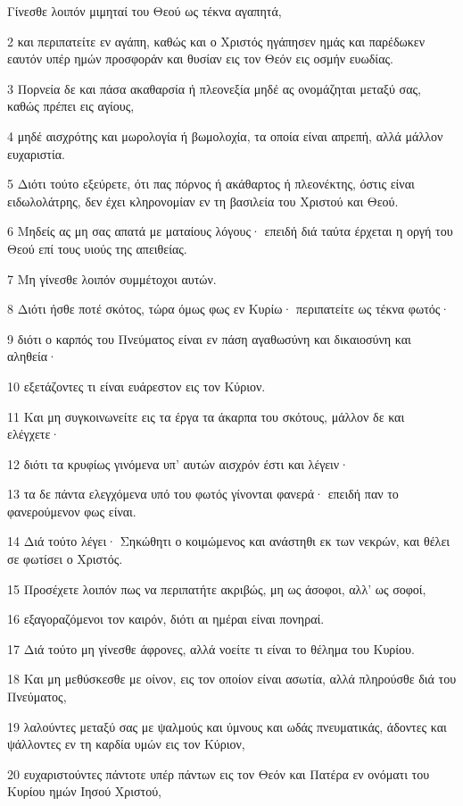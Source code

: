 \par Γίνεσθε λοιπόν μιμηταί του Θεού ως τέκνα αγαπητά,
\par 2 και περιπατείτε εν αγάπη, καθώς και ο Χριστός ηγάπησεν ημάς και παρέδωκεν εαυτόν υπέρ ημών προσφοράν και θυσίαν εις τον Θεόν εις οσμήν ευωδίας.
\par 3 Πορνεία δε και πάσα ακαθαρσία ή πλεονεξία μηδέ ας ονομάζηται μεταξύ σας, καθώς πρέπει εις αγίους,
\par 4 μηδέ αισχρότης και μωρολογία ή βωμολοχία, τα οποία είναι απρεπή, αλλά μάλλον ευχαριστία.
\par 5 Διότι τούτο εξεύρετε, ότι πας πόρνος ή ακάθαρτος ή πλεονέκτης, όστις είναι ειδωλολάτρης, δεν έχει κληρονομίαν εν τη βασιλεία του Χριστού και Θεού.
\par 6 Μηδείς ας μη σας απατά με ματαίους λόγους· επειδή διά ταύτα έρχεται η οργή του Θεού επί τους υιούς της απειθείας.
\par 7 Μη γίνεσθε λοιπόν συμμέτοχοι αυτών.
\par 8 Διότι ήσθε ποτέ σκότος, τώρα όμως φως εν Κυρίω· περιπατείτε ως τέκνα φωτός·
\par 9 διότι ο καρπός του Πνεύματος είναι εν πάση αγαθωσύνη και δικαιοσύνη και αληθεία·
\par 10 εξετάζοντες τι είναι ευάρεστον εις τον Κύριον.
\par 11 Και μη συγκοινωνείτε εις τα έργα τα άκαρπα του σκότους, μάλλον δε και ελέγχετε·
\par 12 διότι τα κρυφίως γινόμενα υπ' αυτών αισχρόν έστι και λέγειν·
\par 13 τα δε πάντα ελεγχόμενα υπό του φωτός γίνονται φανερά· επειδή παν το φανερούμενον φως είναι.
\par 14 Διά τούτο λέγει· Σηκώθητι ο κοιμώμενος και ανάστηθι εκ των νεκρών, και θέλει σε φωτίσει ο Χριστός.
\par 15 Προσέχετε λοιπόν πως να περιπατήτε ακριβώς, μη ως άσοφοι, αλλ' ως σοφοί,
\par 16 εξαγοραζόμενοι τον καιρόν, διότι αι ημέραι είναι πονηραί.
\par 17 Διά τούτο μη γίνεσθε άφρονες, αλλά νοείτε τι είναι το θέλημα του Κυρίου.
\par 18 Και μη μεθύσκεσθε με οίνον, εις τον οποίον είναι ασωτία, αλλά πληρούσθε διά του Πνεύματος,
\par 19 λαλούντες μεταξύ σας με ψαλμούς και ύμνους και ωδάς πνευματικάς, άδοντες και ψάλλοντες εν τη καρδία υμών εις τον Κύριον,
\par 20 ευχαριστούντες πάντοτε υπέρ πάντων εις τον Θεόν και Πατέρα εν ονόματι του Κυρίου ημών Ιησού Χριστού,
